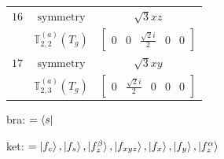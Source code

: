 \documentclass[fleqn,8pt,landscape]{jsarticle}
\begin{document}
\begin{longtable}{ccc}
$ 16 $ & $ \text{symmetry} $ & $ \sqrt{3} x z $ \\
$  $ & $ \mathbb{T}_{2,2}^{(a)}(T_{g}) $ & $ \begin{bmatrix} 0 & 0 & \frac{\sqrt{2} i}{2} & 0 & 0 \end{bmatrix} $ \\ \hline
$ 17 $ & $ \text{symmetry} $ & $ \sqrt{3} x y $ \\
$  $ & $ \mathbb{T}_{2,3}^{(a)}(T_{g}) $ & $ \begin{bmatrix} 0 & \frac{\sqrt{2} i}{2} & 0 & 0 & 0 \end{bmatrix} $ \\ \hline
\end{longtable}
bra: $=\bra{s}$

\noindent
ket: $=\ket{f_{c}}, \ket{f_{s}}, \ket{f_{z}^{\beta}}, \ket{f_{xyz}}, \ket{f_{x}}, \ket{f_{y}}, \ket{f_{z}^{\alpha}}$
\renewcommand{\arraystretch}{1.6}
\end{document}
